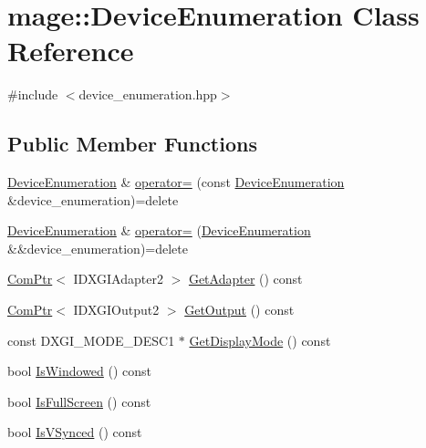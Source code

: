 \hypertarget{classmage_1_1_device_enumeration}{}\section{mage\+:\+:Device\+Enumeration Class Reference}
\label{classmage_1_1_device_enumeration}


{\ttfamily \#include $<$device\+\_\+enumeration.\+hpp$>$}

\subsection*{Public Member Functions}
\begin{DoxyCompactItemize}
\item 
\hyperlink{classmage_1_1_device_enumeration}{Device\+Enumeration} \& \hyperlink{classmage_1_1_device_enumeration_a03e3affa2b8bb4837cffda7b11389bea}{operator=} (const \hyperlink{classmage_1_1_device_enumeration}{Device\+Enumeration} \&device\+\_\+enumeration)=delete
\item 
\hyperlink{classmage_1_1_device_enumeration}{Device\+Enumeration} \& \hyperlink{classmage_1_1_device_enumeration_accf36804bfe510cc8a4d8495854596d6}{operator=} (\hyperlink{classmage_1_1_device_enumeration}{Device\+Enumeration} \&\&device\+\_\+enumeration)=delete
\item 
\hyperlink{namespacemage_ae74f374780900893caa5555d1031fd79}{Com\+Ptr}$<$ I\+D\+X\+G\+I\+Adapter2 $>$ \hyperlink{classmage_1_1_device_enumeration_ad8a0702abdc70ea8fc1b6e46544839a1}{Get\+Adapter} () const
\item 
\hyperlink{namespacemage_ae74f374780900893caa5555d1031fd79}{Com\+Ptr}$<$ I\+D\+X\+G\+I\+Output2 $>$ \hyperlink{classmage_1_1_device_enumeration_ac3958dd53d2fdb8ff645d8dca6dc5fdd}{Get\+Output} () const
\item 
const D\+X\+G\+I\+\_\+\+M\+O\+D\+E\+\_\+\+D\+E\+S\+C1 $\ast$ \hyperlink{classmage_1_1_device_enumeration_a533ac2f6ea91604a3ea3cc8d93c3de87}{Get\+Display\+Mode} () const
\item 
bool \hyperlink{classmage_1_1_device_enumeration_a51479c8c85b286f78730c5622604e524}{Is\+Windowed} () const
\item 
bool \hyperlink{classmage_1_1_device_enumeration_a8957ecacc567708e80694b25aa141c4e}{Is\+Full\+Screen} () const
\item 
bool \hyperlink{classmage_1_1_device_enumeration_a035e2430142e4e4ffcbc712f83e1e7e0}{Is\+V\+Synced} () const
\end{DoxyCompactItemize}
